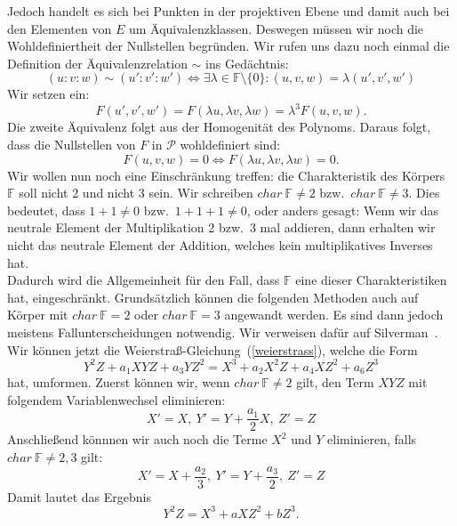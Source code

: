 \documentclass[hidelinks]{article}
\theoremstyle{plain}
\theoremstyle{definition}
\theoremstyle{rem}
\newcommand{\fnz}{\mathbb{F}\setminus\{0\}}
\begin{document}
\begin{sloppypar}
Jedoch handelt es sich bei Punkten in der projektiven Ebene und damit auch bei den Elementen von $E$ um Äquivalenzklassen. Deswegen müssen wir noch die Wohldefiniertheit der Nullstellen begründen. 
Wir rufen uns dazu noch einmal die Definition der Äquivalenzrelation $\sim$ ins Gedächtnis: 
\begin{equation*}
	(u:v:w) \sim (u':v':w') \Leftrightarrow \exists \lambda \in \fnz: (u,v,w) = \lambda (u',v',w')
\end{equation*}
Wir setzen ein:
\begin{equation*}
    F(u',v',w') = F(\lambda u, \lambda v, \lambda w) = \lambda^3 F(u,v,w).
\end{equation*}
Die zweite Äquivalenz folgt aus der Homogenität des Polynoms. Daraus folgt, dass die Nullstellen von $F$ in $\mathcal{P}$ wohldefiniert sind:
\begin{equation*}
    F(u,v,w) = 0 \Leftrightarrow F(\lambda u, \lambda v, \lambda w) = 0.
\end{equation*}
Wir wollen nun noch eine Einschränkung treffen: die Charakteristik des Körpers $\mathbb{F}$ soll nicht 2 und nicht 3 sein. Wir schreiben $char \: \mathbb{F} \neq 2$ bzw.\ $char \: \mathbb{F} \neq 3$. 
Dies bedeutet, dass $1 + 1 \neq 0$ bzw.\ $1 + 1 + 1 \neq 0$, oder anders gesagt: Wenn wir das neutrale Element der Multiplikation 2 bzw.\ 3 mal addieren, dann erhalten wir nicht das neutrale Element der Addition, welches kein multiplikatives Inverses hat. \\
Dadurch wird die Allgemeinheit für den Fall, dass $\mathbb{F}$ eine dieser Charakteristiken hat, eingeschränkt. Grundsätzlich können die folgenden Methoden auch auf Körper mit $char \: \mathbb{F}=2$ oder $char \: \mathbb{F}=3$ angewandt werden. Es sind dann jedoch meistens Fallunterscheidungen notwendig. Wir verweisen dafür auf Silverman~\cite[Seite~44]{silverman}.  \\ 
\newline
Wir können jetzt die Weierstraß-Gleichung~(\ref{weierstrass}), welche die Form
\begin{equation*}
    Y^2Z + a_1XYZ + a_3YZ^2 = X^3 + a_2X^2Z + a_4XZ^2 + a_6Z^3
\end{equation*}
hat, umformen. Zuerst können wir, wenn $char \: \mathbb{F} \neq 2$ gilt, den Term $XYZ$ mit folgendem Variablenwechsel eliminieren:
\begin{equation*}
    X' = X, \: Y' = Y + \frac{a_1}{2} X, \: Z' = Z 
\end{equation*}
Anschließend könnnen wir auch noch die Terme $X^2$ und $Y$ eliminieren, falls $char \: \mathbb{F} \neq 2,3$ gilt:
\begin{equation*}
    X' = X + \frac{a_2}{3}, \: Y' = Y + \frac{a_3}{2}, \: Z' = Z
\end{equation*}
Damit lautet das Ergebnis
\begin{equation} \label{reduziert-weierstrass}
    Y^2Z = X^3 + aXZ^2 + bZ^3.
\end{equation}

\end{sloppypar}
\end{document}
